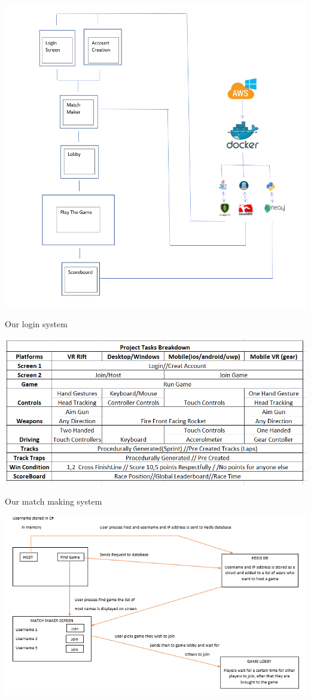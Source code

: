 \includegraphics[width=1\columnwidth]{img/Overview.PNG}

Our login system

\includegraphics[width=1\columnwidth]{img/breakdown.PNG}

Our match making system

\includegraphics[width=1\columnwidth]{img/redisMatch.PNG}

